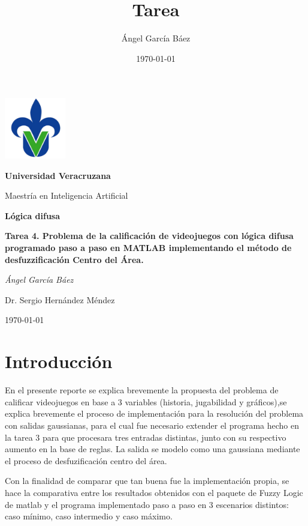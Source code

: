 \documentclass[11pt, letterpaper]{article}
\title{\bfseries Tarea}
\author{Ángel García Báez}
\date{\today}
\begin{document}
	\begin{titlepage}
		\centering
		\includegraphics[width=0.2\textwidth]{logo.png}\par
		\vspace{1cm}
		{\LARGE \bfseries Universidad Veracruzana \par}
		\vspace{1cm}
		{\Large Maestría en Inteligencia Artificial\par}
		\vspace{3cm}
		{\LARGE \bfseries Lógica difusa \par}
		\vspace{1cm}
		{\Large \bfseries Tarea 4. Problema de la calificación de videojuegos con lógica difusa programado paso a paso en MATLAB implementando el método de desfuzzificación Centro del Área. \par}
		\vfill
		{\Large \textit{Ángel García Báez}\par}
		\vfill
		{\Large Dr. Sergio Hernández Méndez \par}
		\vfill
		{\Large \today \par}
	\end{titlepage}
	
	\newpage
	\tableofcontents
	\newpage
	

\section{Introducción}

En el presente reporte se explica brevemente la propuesta del problema de calificar videojuegos en base a 3 variables (historia, jugabilidad y gráficos),se explica brevemente el proceso de implementación para la resolución del problema con salidas gaussianas, para el cual fue necesario extender el programa hecho en la tarea 3 para que procesara tres entradas distintas, junto con su respectivo aumento en la base de reglas. La salida se modelo como una gaussiana mediante el proceso de desfuzificación centro del área.

Con la finalidad de comparar que tan buena fue la implementación propia, se hace la comparativa entre los resultados obtenidos con el paquete de Fuzzy Logic de matlab y el programa implementado paso a paso en 3 escenarios distintos: caso mínimo, caso intermedio y caso máximo.
\end{document}

